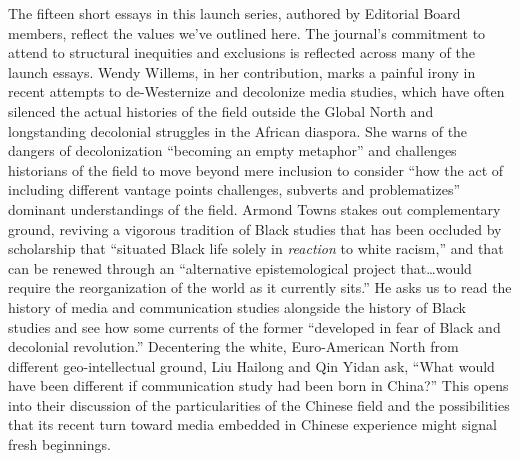 \documentclass{tufte-handout}
\begin{document}
The fifteen short essays in this launch series, authored by Editorial
Board members, reflect the values we've outlined here. The journal's
commitment to attend to structural inequities and exclusions is
reflected across many of the launch essays. Wendy Willems, in her
contribution, marks a painful irony in recent attempts to de-Westernize
and decolonize media studies, which have often silenced the actual
histories of the field outside the Global North and longstanding
decolonial struggles in the African diaspora. She warns of the dangers
of decolonization ``becoming an empty metaphor'' and challenges
historians of the field to move beyond mere inclusion to consider ``how
the act of including different vantage points challenges, subverts and
problematizes'' dominant understandings of the field. Armond Towns
stakes out complementary ground, reviving a vigorous tradition of Black
studies that has been occluded by scholarship that ``situated Black life
solely in \emph{reaction} to white racism,'' and that can be renewed
through an ``alternative epistemological project that\ldots would
require the reorganization of the world as it currently sits.'' He asks
us to read the history of media and communication studies alongside the
history of Black studies and see how some currents of the former
``developed in fear of Black and decolonial revolution.'' Decentering
the white, Euro-American North from different geo-intellectual ground,
Liu Hailong and Qin Yidan ask, ``What would have been different if
communication study had been born in China?'' This opens into their
discussion of the particularities of the Chinese field and the
possibilities that its recent turn toward media embedded in Chinese
experience might signal fresh beginnings.
\end{document}

